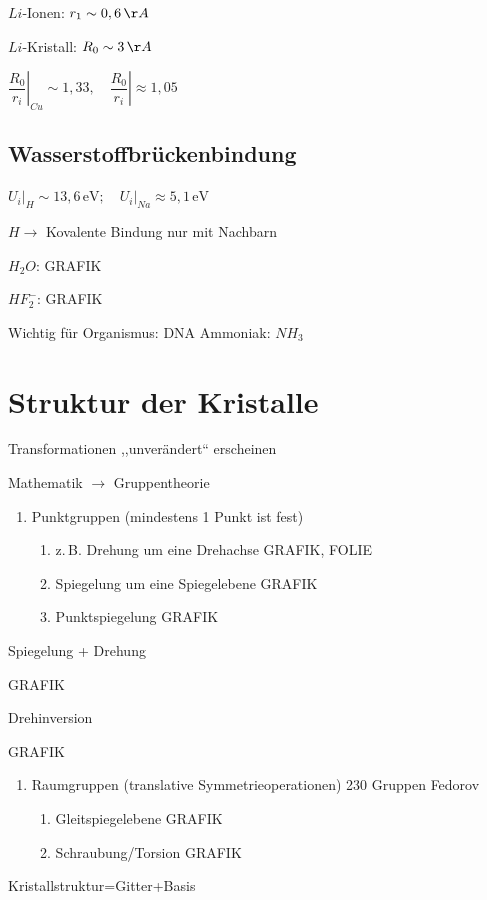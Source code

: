 $Li$-Ionen: $r_{1}\sim0,6\,\AA$

$Li$-Kristall: $R_{0}\sim3\,\AA$

$\left.\dfrac{R_{0}}{r_{i}}\right|_{Cu}\sim1,33,\quad\left.\dfrac{R_{0}}{r_{i}}\right|\approx1,05$


\subsection{Wasserstoffbrückenbindung}

$\left.U_{i}\right|_{H}\sim13,6\,\text{eV};\quad\left.U_{i}\right|_{Na}\approx5,1\,\text{eV}$

$H\to$ Kovalente Bindung nur mit  Nachbarn

$H_2 O$: GRAFIK

$HF^-_2$: GRAFIK

Wichtig f\"ur Organismus: DNA
Ammoniak: $NH_{3}$


\section{Struktur der Kristalle}

 Transformationen ,,unverändert{}`` erscheinen

Mathematik $\to$ Gruppentheorie
\begin{enumerate}
\item Punktgruppen (mindestens 1 Punkt ist fest)

\begin{enumerate}
\item z.\,B. Drehung um eine Drehachse GRAFIK, FOLIE
\item Spiegelung um eine Spiegelebene GRAFIK
\item Punktspiegelung GRAFIK
\end{enumerate}
\end{enumerate}
Spiegelung + Drehung

GRAFIK

Drehinversion

GRAFIK

\setcounter{enumi}{2} 
\begin{enumerate}
\item Raumgruppen (translative Symmetrieoperationen)
230 Gruppen Fedorov 
\begin{enumerate}
\item Gleitspiegelebene GRAFIK
\item Schraubung/Torsion GRAFIK
\end{enumerate}
\end{enumerate}
Kristallstruktur=Gitter+Basis

